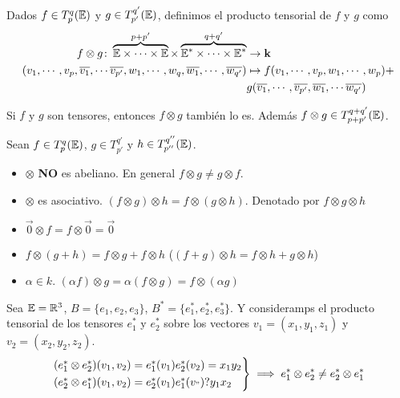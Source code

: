 \begin{defi}
	Dados $f \in T_p^q(\mathbb{E})$ y $g \in T_{p'}^{q'}(\mathbb{E})$, definimos el producto
	tensorial de $f$ y $g$ como
	\[
		\begin{aligned}
			f \otimes g \colon \overbrace{\mathbb{E} \times \cdots \times \mathbb{E}}^{p+p'}
			\times \overbrace{\mathbb{E}^* \times \cdots \times \mathbb{E}^*}^{q+q'} &\to \mathbf{k} \\
			(v_1, \cdots, v_p, \overline{v_1}, \cdots \overline{v_{p'}},
			w_1, \cdots, w_q, \overline{w_1}, \cdots, \overline{w_{q'}})
			&\mapsto f(v_1, \cdots, v_p, w_1, \cdots, w_p) + \\
			&g(\overline{v_1}, \cdots, \overline{v_{p'}}, \overline{w_1}, \cdots
			\overline{w_{q'}})
		\end{aligned}
	\]
\end{defi}
\begin{obs}
	Si $f$ y $g$ son tensores, entonces $f \otimes g$ también lo es. Además
	$f \otimes g \in T_{p+p'}^{q+q'}(\mathbb{E})$.
\end{obs}
\begin{prop}
	Sean  $f \in T_p^q(\mathbb{E})$, $g \in T_{p'}^{q'}$ y $h \in T_{p''}^{q''}(\mathbb{E})$.
	\begin{itemize}
		\item $\otimes$ {\bfseries NO} es abeliano. En general $f \otimes g \neq
		g \otimes f$.
		\item $\otimes$ es asociativo. $(f \otimes g) \otimes h = f \otimes (g
		\otimes h)$. Denotado por $f \otimes g \otimes h$
		\item $\vec{0} \otimes f = f \otimes \vec{0} = \vec{0}$
		\item $f \otimes (g + h) = f \otimes g + f\otimes h$ \quad ($(f+g) \otimes
		h = f \otimes h + g \otimes h$)
		\item $\alpha \in k$. $(\alpha f) \otimes g = \alpha(f \otimes g) =
		f \otimes (\alpha g)$
	\end{itemize}
\end{prop}
\begin{example}
	Sea $\mathbb{E} = \mathbb{R}^3$, $B = \{e_1, e_2, e_3\}$, $B^* = \{ e_1^*, e_2^*, e_3^*\}$.
	Y consideramps el producto tensorial de los tensores $e_1^*$ y $e_2^*$ sobre
	los vectores $v_1 = (x_1, y_1, z_1)$ y $v_2 = (x_2,y_2,z_2)$.
	\[
		\begin{rcases}
			(e_1^* \otimes e_2^*)(v_1, v_2) = e_1^*(v_1)e_2^*(v_2) = x_1y_2 \\
			(e_2^* \otimes e_1^*)(v_1, v_2) = e_2^*(v_1)e_1^*(v_") ? y_1x_2
		\end{rcases}
		\implies e_1^* \otimes e_2^* \neq e_2^* \otimes e_1^*
	\]
\end{example}
